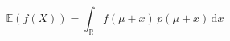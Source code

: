 \documentclass[preview]{standalone}
\begin{document}
\begin{equation}
\tag{18}
    \mathbb{E} ( f ( X ) ) = \int_{\mathbb{R}} f ( \mu + x ) \, p ( \mu + x ) \, \mathrm{d}x
\end{equation}
\end{document}
